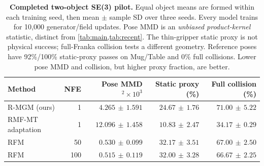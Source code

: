 \begin{table}[t]
\centering\small
\caption{\textbf{Completed two-object SE(3) pilot.} Equal object means are formed within each training seed, then mean $\pm$ sample SD over three seeds. Every model trains for 10,000 generator/field updates. Pose MMD is an \emph{unbiased product-kernel} statistic, distinct from \cref{tab:main,tab:recent}. The thin-gripper static proxy is not physical success; full-Franka collision tests a different geometry. Reference poses have 92\%/100\% static-proxy passes on Mug/Table and 0\% full collisions. Lower pose MMD and collision, but higher proxy fraction, are better.}
\label{tab:grasp}
\begin{tabular}{@{}lrrrr@{}}
\toprule
Method & NFE & Pose MMD$^2\times10^3$ & Static proxy (\%) & Full collision (\%) \\
\midrule
R-MGM (ours) & 1 & $4.265\,\pm\,1.591$ & $24.67\,\pm\,1.76$ & $71.00\,\pm\,5.22$ \\
RMF-MT adaptation & 1 & $12.096\,\pm\,1.458$ & $10.83\,\pm\,2.47$ & $34.17\,\pm\,0.29$ \\
RFM & 50 & $0.530\,\pm\,0.099$ & $32.17\,\pm\,3.51$ & $67.00\,\pm\,2.50$ \\
RFM & 100 & $0.515\,\pm\,0.119$ & $32.00\,\pm\,3.28$ & $66.67\,\pm\,2.25$ \\
\bottomrule
\end{tabular}
\end{table}
